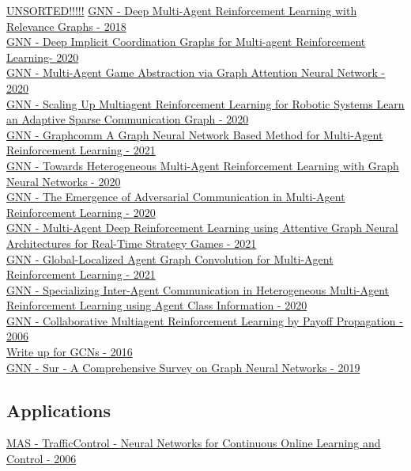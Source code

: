 \underline{UNSORTED!!!!!}
\href{https://arxiv.org/abs/1811.12557}{GNN - Deep Multi-Agent Reinforcement Learning with Relevance Graphs - 2018}
\\
\href{https://arxiv.org/abs/2006.11438}{GNN - Deep Implicit Coordination Graphs for Multi-agent Reinforcement Learning- 2020}
\\
\href{https://ojs.aaai.org/index.php/AAAI/article/view/6211}{GNN - Multi-Agent Game Abstraction via Graph Attention Neural Network  - 2020}
\\
\href{https://arxiv.org/abs/2003.01040}{GNN - Scaling Up Multiagent Reinforcement Learning for Robotic Systems Learn an Adaptive Sparse Communication Graph - 2020}
\\
\href{https://ieeexplore.ieee.org/abstract/document/9413716}{GNN - Graphcomm A Graph Neural Network Based Method for Multi-Agent Reinforcement Learning - 2021}
\\
\href{https://arxiv.org/abs/2009.13161}{GNN - Towards Heterogeneous Multi-Agent Reinforcement Learning with Graph Neural Networks - 2020}
\\
\href{https://arxiv.org/abs/2008.02616}{GNN - The Emergence of Adversarial Communication in Multi-Agent Reinforcement Learning - 2020}
\\
\href{https://arxiv.org/abs/2105.10211}{GNN - Multi-Agent Deep Reinforcement Learning using Attentive Graph Neural Architectures for Real-Time Strategy Games - 2021}
\\
\href{https://ieeexplore.ieee.org/abstract/document/9414993}{GNN - Global-Localized Agent Graph Convolution for Multi-Agent Reinforcement Learning - 2021}
\\
\href{https://arxiv.org/abs/2012.07617}{GNN - Specializing Inter-Agent Communication in Heterogeneous Multi-Agent Reinforcement Learning using Agent Class Information - 2020}
\\
\href{https://dl.acm.org/doi/abs/10.5555/1248547.1248612}{GNN - Collaborative Multiagent Reinforcement Learning by Payoff Propagation - 2006}
\\
\href{https://tkipf.github.io/graph-convolutional-networks/}{Write up for GCNs - 2016}
\\
\href{https://arxiv.org/abs/1901.00596}{GNN - Sur - A Comprehensive Survey on Graph Neural Networks - 2019}
\\


\subsection{Applications}
\href{https://ieeexplore.ieee.org/abstract/document/4012019}{MAS - TrafficControl - Neural Networks for Continuous Online Learning and Control - 2006}
\\
